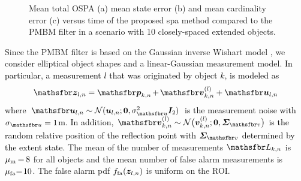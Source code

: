 \documentclass[10pt, twoside, romanappendices]{IEEEtran}
\providecommand{\rd}{\textcolor{black}}
\providecommand{\rmv}{\hspace*{-.3mm}}
\begin{document}
\begin{figure}[t!]
\captionsetup{singlelinecheck = false, justification=justified}
\caption{Mean total OSPA (a) mean state error (b) and mean cardinality error (c) versus time of the proposed \ac{spa} method compared to the PMBM filter in a scenario with 10 closely-spaced extended objects.}
\label{fig:errors}
\end{figure}

Since the PMBM filter is based on the Gaussian inverse Wishart model \cite{GraFatSve:J19}, we consider elliptical object shapes and a linear-Gaussian measurement model. \rd{In particular, a measurement $l$ that was originated by object $k$, is modeled as}  
\begin{equation}
\RV{z}_{l,n} = \RV{p}_{k,n} \rmv+\rmv \RV{v}^{(l)}_{k,n}  + \RV{u}_{l,n} \label{eq:measModelSim3}
\vspace{.8mm}
\end{equation}
\rd{where $\RV{u}_{l,n} \sim \mathcal{N}(\V{u}_{l,n} ;\V{0},\sigma^2_{\rv{u}}\M{I}_2)$ is the measurement noise with $\sigma_{\rv{u}} = 1$m. In addition, $\RV{v}_{k,n}^{(l)} \sim \mathcal{N}\big(\V{v}^{(l)}_{k,n};\V{0}, \M{\Sigma}_{\rv{v}} \big) $ is the random relative position of the reflection point with $\M{\Sigma}_{\rv{v}}$ determined by the extent state.} The mean of the number of measurements $\rv{L}_{k,n}$ is $\mu_{\mathrm{m}} \rmv=\rmv 8$ for all objects and the mean number of false alarm measurements is $\mu_{\mathrm{fa}} \!\rmv=\! 10$. The false alarm \ac{pdf} $f_{\mathrm{fa}}(\bm{z}_{l,n})$ is uniform on the ROI. 
\end{document}
